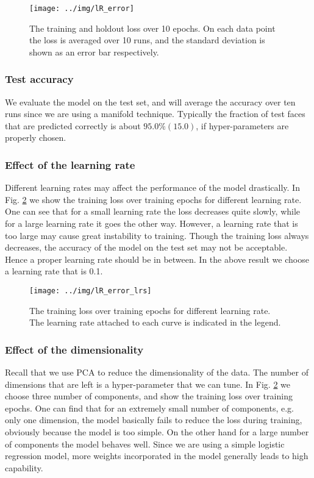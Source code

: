 \documentclass{article} %
\begin{document}
\begin{figure}[h]
\centering
\texttt{[image: ../img/lR\_error]}
\caption{The training and holdout loss over 10 epochs. On each data point the loss is averaged over 10 runs, and the standard deviation is shown as an error bar respectively.}
\label{fig:error}
\end{figure}

\subsubsection{Test accuracy}
We evaluate the model on the test set, and will average the accuracy over ten runs since we are using a manifold technique. Typically the fraction of test faces that are predicted correctly is about $95.0 \% (15.0)$, if hyper-parameters are properly chosen.

\subsubsection{Effect of the learning rate}
Different learning rates may affect the performance of the model drastically. In Fig. \ref{fig:error_lr} we show the training loss over training epochs for different learning rate. One can see that for a small learning rate the loss decreases quite slowly, while for a large learning rate it goes the other way. However, a learning rate that is too large may cause great instability to training. Though the training loss always decreases, the accuracy of the model on the test set may not be acceptable. Hence a proper learning rate should be in between. In the above result we choose a learning rate that is 0.1.

\begin{figure}[h]
\centering
\texttt{[image: ../img/lR\_error\_lrs]}
\caption{The training loss over training epochs for different learning rate. The learning rate attached to each curve is indicated in the legend.}
\label{fig:error_lr}
\end{figure}

\subsubsection{Effect of the dimensionality}
Recall that we use PCA to reduce the dimensionality of the data. The number of dimensions that are left is a hyper-parameter that we can tune. In Fig. \ref{fig:error_lr} we choose three number of components, and show the training loss over training epochs. One can find that for an extremely small number of components, e.g. only one dimension, the model basically fails to reduce the loss during training, obviously because the model is too simple. On the other hand for a large number of components the model behaves well. Since we are using a simple logistic regression model, more weights incorporated in the model generally leads to high capability.
\end{document}
